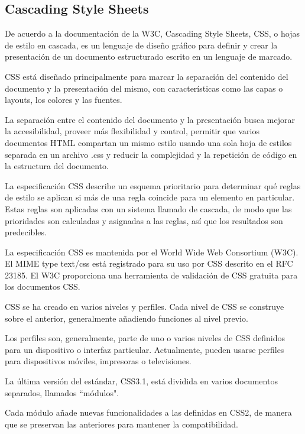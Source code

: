 \subsection*{Cascading Style Sheets}

De acuerdo a la documentación de la W3C\cite{noauthor_what_nodate}, Cascading Style Sheets, CSS, o hojas de estilo en cascada, es un lenguaje de diseño gráfico para definir y crear la presentación de un documento estructurado escrito en un lenguaje de marcado.


CSS está diseñado principalmente para marcar la separación del contenido del documento y la presentación del mismo, con características como las capas o layouts, los colores y las fuentes.


La separación entre el contenido del documento y la presentación busca mejorar la accesibilidad, proveer más flexibilidad y control, permitir que varios documentos HTML compartan un mismo estilo usando una sola hoja de estilos separada en un archivo .css y reducir la complejidad y la repetición de código en la estructura del documento.


La especificación CSS describe un esquema prioritario para determinar qué reglas de estilo se aplican si más de una regla coincide para un elemento en particular. Estas reglas son aplicadas con un sistema llamado de cascada, de modo que las prioridades son calculadas y asignadas a las reglas, así que los resultados son predecibles.


La especificación CSS es mantenida por el World Wide Web Consortium (W3C). El MIME type text/css está registrado para su uso por CSS descrito en el RFC 23185​. El W3C proporciona una herramienta de validación de CSS gratuita para los documentos CSS.



CSS se ha creado en varios niveles y perfiles. Cada nivel de CSS se construye sobre el anterior, generalmente añadiendo funciones al nivel previo.


Los perfiles son, generalmente, parte de uno o varios niveles de CSS definidos para un dispositivo o interfaz particular. Actualmente, pueden usarse perfiles para dispositivos móviles, impresoras o televisiones.


La última versión del estándar, CSS3.1, está dividida en varios documentos separados, llamados ``módulos".


Cada módulo añade nuevas funcionalidades a las definidas en CSS2, de manera que se preservan las anteriores para mantener la compatibilidad.


